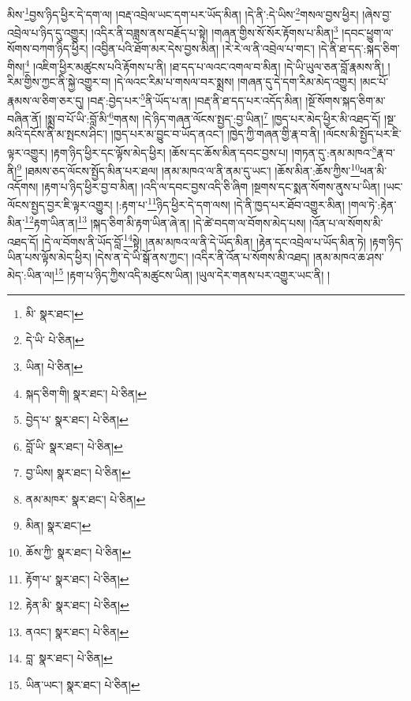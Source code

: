 མིས་\footnote{མི་  སྣར་ཐང་། }བྱས་ཉིད་ཕྱིར་དེ་དག་ལ། །བརྡ་འབྲེལ་ཡང་དག་པར་ཡོད་མིན། །དེ་ནི་:དེ་ཡིས་\footnote{དེ་ཡི་  པེ་ཅིན། }གསལ་བྱས་ཕྱིར། །ཞེས་བྱ་འབྲེལ་པ་ཉིད་དུ་འགྱུར། །འདིར་ནི་བཟླས་ནས་བརྗོད་པ་སྟེ། །གཞན་གྱིས་སོ་སོར་རྟོགས་པ་མིན།\footnote{ཡིན།  པེ་ཅིན། } །དབང་ཕྱུག་ལ་སོགས་བཀག་ཉིད་ཕྱིར། །འབྱིན་པའི་ཐོག་མར་དེས་བྱས་མིན། །རེ་རེ་ལ་ནི་འབྲེལ་པ་གང་། །དེ་ནི་ཐ་དད་:སྐད་ཅིག་གིས།\footnote{སྐད་ཅིག་གི།  སྣར་ཐང་།  པེ་ཅིན། } །འཇིག་ཕྱིར་མཚུངས་པའི་རྟོགས་པ་ནི། །ཐ་དད་པ་ལའང་འགལ་བ་མིན། །དེ་ཡི་ཡུལ་ཅན་བློ་རྣམས་ནི། །རིམ་གྱིས་ཀྱང་ནི་སྐྱེ་འགྱུར་བ། །དེ་ལའང་རིམ་པ་གསལ་བར་སྨྲས། །གཞན་དུ་དེ་དག་རིམ་མེད་འགྱུར། །མང་པོ་རྣམས་ལ་ཅིག་ཅར་དུ། །བརྡ་:བྱེད་པར་\footnote{བྱེད་པ་  སྣར་ཐང་།  པེ་ཅིན། }ནི་ཡོད་པ་ན། །བརྡ་ནི་ཐ་དད་པར་འདོད་མིན། །སྔོ་སོགས་སྐད་ཅིག་མ་བཞིན་ནོ། །སྨྲ་བ་པོ་ཡི་:བློ་མི་\footnote{བློ་ཡི་  སྣར་ཐང་།  པེ་ཅིན། }གནས། །དེ་ཉིད་གཞན་ལོངས་སྤྱད་:བྱ་ཡིན།\footnote{བྱ་ཡིས།  སྣར་ཐང་།  པེ་ཅིན། } །ཁྱད་པར་མེད་ཕྱིར་མི་འཐད་དོ། །སྔ་མའི་དངོས་ནི་མ་སྤངས་ཤིང་། །ཁྱད་པར་མ་བྱུང་བ་ཡོད་ནའང་། །ཁྱེད་ཀྱི་གཞན་གྱི་རྣ་བ་ནི། །ལོངས་མི་སྤྱོད་པར་ཇི་ལྟར་འགྱུར། །རྟག་ཉིད་ཕྱིར་དང་ལྟོས་མེད་ཕྱིར། །ཆོས་དང་ཆོས་མིན་དབང་བྱས་པ། །གཏན་དུ་:ནམ་མཁའ་\footnote{ནམ་མཁར་  སྣར་ཐང་།  པེ་ཅིན། }རྣ་བ་ནི།\footnote{མིན།  སྣར་ཐང་། } །ཐམས་ཅད་ལོངས་སྤྱོད་མིན་པར་ཐལ། །ནམ་མཁའ་ལ་ནི་ནམ་དུ་ཡང་། །ཆོས་མིན་:ཆོས་ཀྱིས་\footnote{ཆོས་ཀྱི་  སྣར་ཐང་།  པེ་ཅིན། }ཕན་མི་འདོགས། །རྟག་པ་ཉིད་ཕྱིར་བྱ་བ་མིན། །འདི་ལ་དབང་བྱས་འདི་ཅི་ཞིག །སྔགས་དང་སྨན་སོགས་ནུས་པ་ཡིན། །ཡང་ལོངས་སྤྱད་བྱར་ཇི་ལྟར་འགྱུར། །:རྟག་པ་\footnote{རྟོག་པ་  སྣར་ཐང་།  པེ་ཅིན། }ཉིད་ཕྱིར་དེ་དག་ལས། །དེ་ནི་ཁྱད་པར་ཐོབ་འགྱུར་མིན། །གལ་ཏེ་:རྟེན་མིན་\footnote{རྟེན་མི་  སྣར་ཐང་།  པེ་ཅིན། }རྟག་ཡིན་ན།\footnote{ནའང་།  སྣར་ཐང་།  པེ་ཅིན། } །སྐད་ཅིག་མི་རྟག་ཡིན་ཞེ་ན། །དེ་ཚེ་བདག་ལ་བོགས་མེད་པས། །འོན་པ་ལ་སོགས་མི་འཐད་དོ། །དེ་ལ་བོགས་ནི་ཡོད་བློ་\footnote{བླ་  སྣར་ཐང་།  པེ་ཅིན། }སྟེ། །ནམ་མཁའ་ལ་ནི་དེ་ཡོད་མིན། །རྟེན་དང་འབྲེལ་པ་ཡོད་མིན་ཏེ། །རྟག་ཉིད་ཡིན་པས་ལྟོས་མེད་ཕྱིར། །དེས་ན་དེ་ཡི་སྒོ་ནས་ཀྱང་། །འདིར་ནི་འོན་པ་སོགས་མི་འཐད། །ནམ་མཁའ་ཆ་ཤས་མེད་:ཡིན་ལ།\footnote{ཡིན་ཡང་།  སྣར་ཐང་།  པེ་ཅིན། } །རྟག་པ་ཉིད་ཀྱིས་འདི་མཚུངས་ཡིན། །ཡུལ་དེར་གནས་པར་འགྱུར་ཡང་ནི། །
